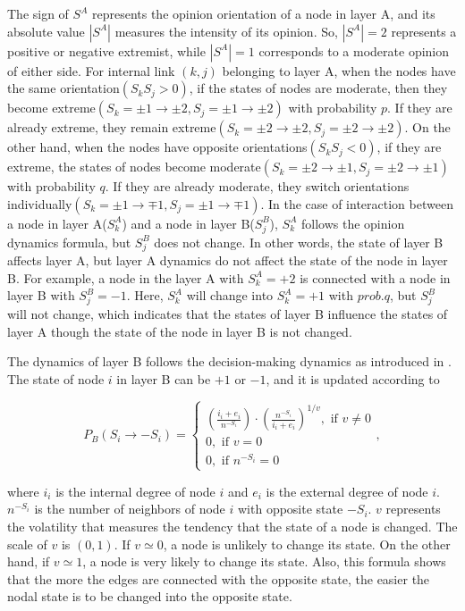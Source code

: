 The sign of $S^A$ represents the opinion orientation of a node in layer A, and its absolute value $|S^A|$ measures the intensity of its opinion. So, $|S^A|=2$ represents a positive or negative extremist, while  $|S^A|=1$ corresponds to a moderate opinion of either side. For internal link $(k, j)$ belonging to layer A, when the nodes have the same orientation$(S_kS_j>0)$, if the states of nodes are moderate, then they become extreme$(S_k=\pm1 \rightarrow \pm2, S_j= \pm1 \rightarrow \pm2)$ with probability $p$. If they are already extreme, they remain extreme$(S_k=\pm2 \rightarrow \pm2, S_j= \pm2 \rightarrow \pm2)$. On the other hand, when the nodes have opposite orientations$(S_kS_j<0)$, if they are extreme, the states of nodes become moderate$(S_k=\pm2 \rightarrow \pm1, S_j= \pm2 \rightarrow \pm1)$ with probability $q$. If they are already moderate, they switch orientations individually$(S_k=\pm1 \rightarrow \mp1, S_j= \pm1 \rightarrow \mp1)$.  In the case of interaction between a node in layer A($S_k^A$) and a node in layer B($S_j^B$), $S_k^A$ follows the opinion dynamics formula, but $S_j^B$ does not change. In other words, the state of layer B affects layer A, but layer A dynamics do not affect the state of the node in layer B. For example, a node in the layer A with $S_k^A = +2$ is connected with  a node in layer B with $S_j^B = -1$. Here, $S_k^A$ will change into $S_k^A = +1$ with $prob.q$, but $S_j^B$ will not change, which indicates that the states of layer B influence the states of layer A though the state of the node in layer B is not changed. 

The dynamics of layer B follows the decision-making dynamics as introduced in \parencite{abrams2003, vazquez2010}. The state of node $i$ in layer B can be $+1$ or $-1$, and it is updated according to

\begin{equation}
{P_B}({S_i} \to  - {S_i}) = \begin{cases}
{\left({\displaystyle\frac{{{i_i} + {e_i}}}{{{n^{ - {S_i}}}}}}\right)}{\cdot}{\left({\displaystyle\frac{{n^{-{S_i}}}}{{{i_i} + {e_i}}}} \right)^{1/v}}  ,\mbox{ if } v \ne 0\\
0,\mbox{ if } v = 0\\
0,\mbox{ if } {n^{ - {S_i}}} = 0
\end{cases},
\end{equation}

where $i_i$ is the internal degree of node $i$ and $e_i$ is the external degree of node $i$. $n^{-S_i}$ is the number of neighbors of node $i$ with opposite state $-S_i$. $v$ represents the volatility that measures the tendency that the state of a node is changed. The scale of $v$ is $(0, 1)$. If $v \simeq 0$,  a node is unlikely to change its state. On the other hand, if $v \simeq 1$, a node is very likely to change its state. Also, this formula shows that the more the edges are connected with the opposite state, the easier the nodal state is to be changed into the opposite state.


